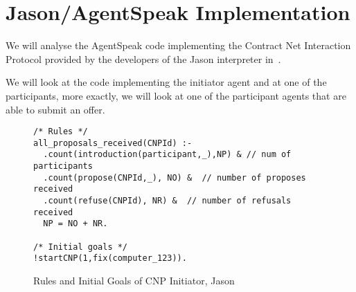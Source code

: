 \documentclass[a4paper,12pt,oneside,fleqn]{book} %
\begin{document}
\section{Jason/AgentSpeak Implementation} %
We will analyse the AgentSpeak code implementing the Contract Net
Interaction Protocol provided by the developers of the Jason interpreter
in~\cite{bordini2007programming}.

We will look at the code implementing the initiator agent and at one of the
participants, more exactly, we will look at one of the participant agents
that are able to submit an offer.

\begin{figure}\footnotesize %
\begin{verbatim}
/* Rules */
all_proposals_received(CNPId) :-
  .count(introduction(participant,_),NP) & // num of participants
  .count(propose(CNPId,_), NO) &  // number of proposes received
  .count(refuse(CNPId), NR) &  // number of refusals received
  NP = NO + NR.

/* Initial goals */
!startCNP(1,fix(computer_123)).

\end{verbatim}
\caption{Rules and Initial Goals of CNP Initiator, Jason}
\label{fig:jasonInRG}

\end{figure} %
\end{document}
